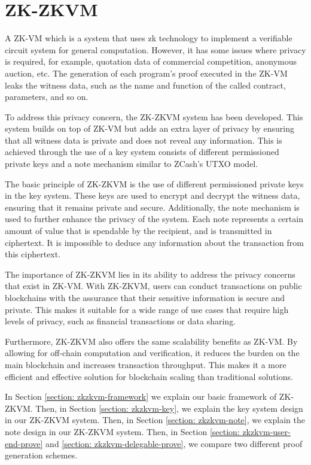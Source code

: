\section{ZK-ZKVM} \label{sec:zk-zkvm}

A ZK-VM which is a system that uses zk technology to implement a verifiable circuit system for general computation. However, it has some issues where privacy is required, for example, quotation data of commercial competition, anonymous auction, etc. The generation of each program's proof executed in the ZK-VM leaks the witness data, such as the name and function of the called contract, parameters, and so on.

To address this privacy concern, the ZK-ZKVM system has been developed. This system builds on top of ZK-VM but adds an extra layer of privacy by ensuring that all witness data is private and does not reveal any information. This is achieved through the use of a key system consists of different permissioned private keys and a note mechanism similar to ZCash's UTXO model.

The basic principle of ZK-ZKVM is the use of different permissioned private keys in the key system. These keys are used to encrypt and decrypt the witness data, ensuring that it remains private and secure. Additionally, the note mechanism is used to further enhance the privacy of the system. Each note represents a certain amount of value that is spendable by the recipient, and is transmitted in ciphertext. It is impossible to deduce any information about the transaction from this ciphertext.

The importance of ZK-ZKVM lies in its ability to address the privacy concerns that exist in ZK-VM. With ZK-ZKVM, users can conduct transactions on public blockchains with the assurance that their sensitive information is secure and private. This makes it suitable for a wide range of use cases that require high levels of privacy, such as financial transactions or data sharing.

Furthermore, ZK-ZKVM also offers the same scalability benefits as ZK-VM. By allowing for off-chain computation and verification, it reduces the burden on the main blockchain and increases transaction throughput. This makes it a more efficient and effective solution for blockchain scaling than traditional solutions.

In Section \ref{section: zkzkvm-framework} we explain our basic framework of ZK-ZKVM. Then, in Section \ref{section: zkzkvm-key}, we explain the key system design in our ZK-ZKVM system. Then, in Section \ref{section: zkzkvm-note}, we explain the note design in our ZK-ZKVM system. Then, in Section \ref{section: zkzkvm-user-end-prove} and \ref{section: zkzkvm-delegable-prove}, we compare two different proof generation schemes.





